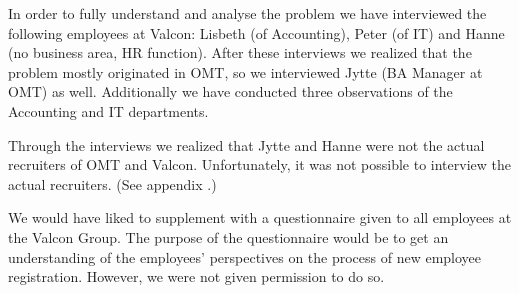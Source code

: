 In order to fully understand and analyse the problem we have interviewed the following employees at Valcon:
Lisbeth (of Accounting), Peter (of IT) and Hanne (no business area, HR function).
After these interviews we realized that the problem mostly originated in OMT, so we interviewed Jytte (BA Manager at OMT) as well.
Additionally we have conducted three observations of the Accounting and IT departments.

Through the interviews we realized that Jytte and Hanne were not the actual recruiters of OMT and Valcon.
Unfortunately, it was not possible to interview the actual recruiters.
(See appendix .)

We would have liked to supplement with a questionnaire given to all employees at the Valcon Group.
The purpose of the questionnaire would be to get an understanding of the employees' perspectives on the process of new employee registration.
However, we were not given permission to do so.